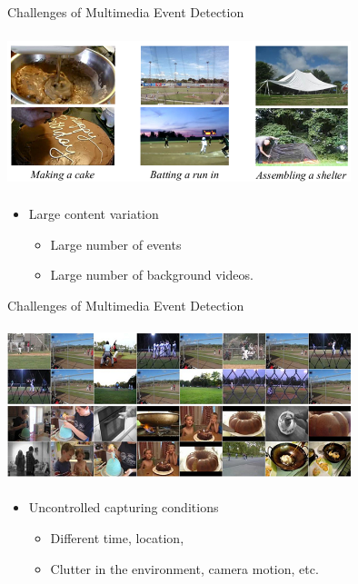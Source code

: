 \documentclass{beamer}
\begin{document}
\begin{frame}[t]{Challenges of Multimedia Event Detection}
\begin{center}
\includegraphics[width=10cm,height=4.5cm]{images/challenge1.png}
\end{center}

\begin{itemize}
\item Large content variation

\begin{itemize}
\item Large number of events
\item Large number of background videos.
\end{itemize}

\end{itemize}

\end{frame}

\begin{frame}[t]{Challenges of Multimedia Event Detection}
\begin{center}
\includegraphics[width=10cm,height=4.5cm]{images/challenge2.png}
\end{center}

\begin{itemize}
\item Uncontrolled capturing conditions 
\begin{itemize}
\item Different time, location,
\item Clutter in the environment, camera motion, etc.
\end{itemize}

\end{itemize}

\end{frame}
\end{document}
